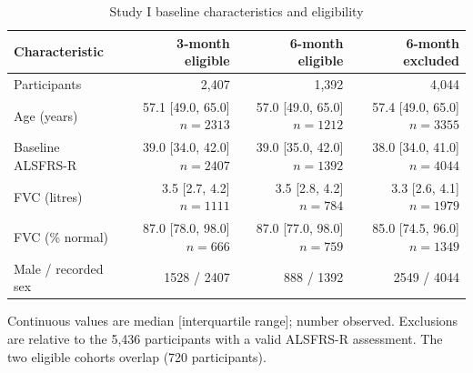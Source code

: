 \begin{table}[ht!]
\centering
\small
\caption[Study I baseline characteristics and eligibility]{Study I baseline characteristics and eligibility}
\label{tab:review_s1_baseline}
\setlength{\tabcolsep}{4pt}
\begin{tabular}{lrrr}
\toprule
Characteristic & \shortstack{3-month\\eligible} & \shortstack{6-month\\eligible} & \shortstack{6-month\\excluded} \\
\midrule
Participants & 2,407 & 1,392 & 4,044 \\
Age (years) & \shortstack{57.1 [49.0, 65.0] \\ $n=2313$} & \shortstack{57.0 [49.0, 65.0] \\ $n=1212$} & \shortstack{57.4 [49.0, 65.0] \\ $n=3355$} \\
Baseline ALSFRS-R & \shortstack{39.0 [34.0, 42.0] \\ $n=2407$} & \shortstack{39.0 [35.0, 42.0] \\ $n=1392$} & \shortstack{38.0 [34.0, 41.0] \\ $n=4044$} \\
FVC (litres) & \shortstack{3.5 [2.7, 4.2] \\ $n=1111$} & \shortstack{3.5 [2.8, 4.2] \\ $n=784$} & \shortstack{3.3 [2.6, 4.1] \\ $n=1979$} \\
FVC (\% normal) & \shortstack{87.0 [78.0, 98.0] \\ $n=666$} & \shortstack{87.0 [77.0, 98.0] \\ $n=759$} & \shortstack{85.0 [74.5, 96.0] \\ $n=1349$} \\
Male / recorded sex & 1528 / 2407 & 888 / 1392 & 2549 / 4044 \\
\bottomrule
\end{tabular}
\par\smallskip
\begin{minipage}{0.98\linewidth}\footnotesize
Continuous values are median [interquartile range]; number observed. Exclusions are relative to the 5,436 participants with a valid ALSFRS-R assessment. The two eligible cohorts overlap (720 participants).
\end{minipage}
\end{table}
